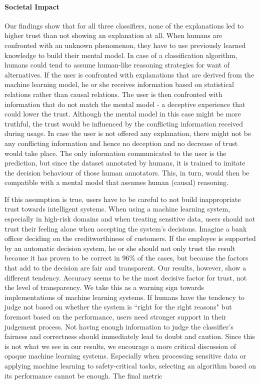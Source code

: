 \paragraph{Societal Impact}
Our findings show that for all three classifiers, none of the explanations led to higher trust than not showing an explanation at all. When humans are confronted with an unknown phenomenon, they have to use previously learned knowledge to build their mental model. In case of a classification algorithm, humans could tend to assume human-like reasoning strategies for want of alternatives.\newline
If the user is confronted with explanations that are derived from the machine learning model, he or she receives information based on statistical relations rather than causal relations. The user is then confronted with information that do not match the mental model - a deceptive experience that could lower the trust. Although the mental model in this case might be more truthful, the trust would be influenced by the conflicting information received during usage.\newline
In case the user is not offered any explanation, there might not be any conflicting information and hence no deception and no decrease of trust would take place. The only information communicated to the user is the prediction, but since the dataset annotated by humans, it is trained to imitate the decision behaviour of those human annotators. This, in turn, would then be compatible with a mental model that assumes human (causal) reasoning.\newline

If this assumption is true, users have to be careful to not build inappropriate trust towards intelligent systems. When using a machine learning system, especially in high-risk domains and when treating sensitive data, users should not trust their feeling alone when accepting the system's decisions. Imagine a bank officer deciding on the creditworthiness of customers. If the employee is supported by an automatic decision system, he or she should not only trust the result because it has proven to be correct in 96\% of the cases, but because the factors that add to the decision are fair and transparent. Our results, however, show a different tendency. Accuracy seems to be the most decisive factor for trust, not the level of transparency. We take this as a warning sign towards implementations of machine learning systems. If humans have the tendency to judge not based on whether the system is ``right for the right reasons" but foremost based on the performance, users need stronger support in their judgement process. Not having enough information to judge the classifier's fairness and correctness should immediately lead to doubt and caution. Since this is not what we see in our results, we encourage a more critical discussion of opaque machine learning systems. Especially when processing sensitive data or applying machine learning to safety-critical tasks, selecting an algorithm based on its performance cannot be enough. The final metric 










